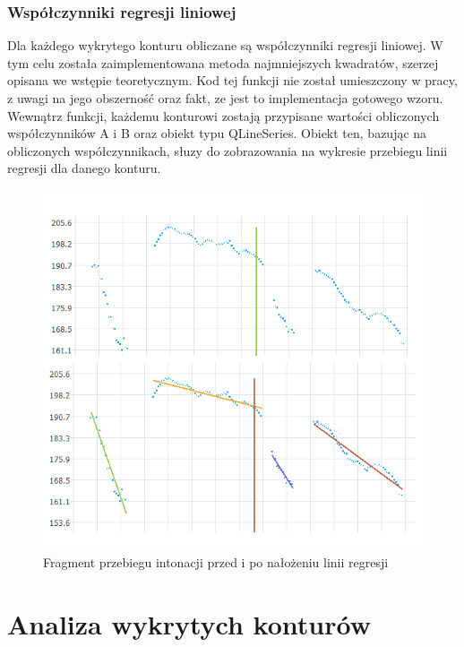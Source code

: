 \documentclass[a4paper,12 pt]{article}
\begin{document}
\subsubsection{Współczynniki regresji liniowej}
Dla każdego wykrytego konturu obliczane są współczynniki regresji liniowej. W tym celu została zaimplementowana metoda najmniejszych kwadratów, szerzej opisana we wstępie teoretycznym.
Kod tej funkcji nie został umieszczony w pracy, z uwagi na jego obszerność oraz fakt, ze jest to  implementacja gotowego wzoru. Wewnątrz funkcji, każdemu konturowi zostają przypisane wartości obliczonych współczynników A i B oraz obiekt typu QLineSeries. Obiekt ten, bazując na obliczonych współczynnikach, słuzy do zobrazowania na wykresie przebiegu linii regresji dla danego konturu.
 \FloatBarrier
\begin{figure}[h]
\centering
\includegraphics[scale=0.7]{regresja.png}
\caption{Fragment przebiegu intonacji przed i po nałożeniu linii regresji}
\end{figure}
\FloatBarrier
\section{Analiza wykrytych konturów}
\end{document}
